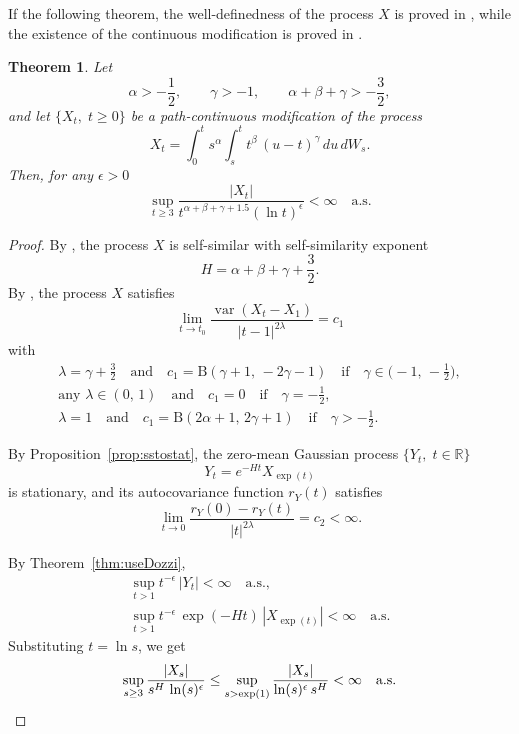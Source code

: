 \documentclass{article}
\DeclareMathOperator{\var}{var}
\theoremstyle{plain}
\newtheorem{thm}{Theorem}
\begin{document}
If the following theorem, the well-definedness
of the process $X$ is proved in
\cite[Theorem~1]{Part1},
while the existence of the continuous modification
is proved in \cite[Theorem~6]{Part1}.
\begin{thm}
Let
\[
\alpha>-\frac12,\qquad
\gamma>-1, \qquad
\alpha+\beta+\gamma > -\frac32 ,
\]
and let $\{X_t,\; t\mathbin{\ge}0\}$ be a path-continuous
modification of the process
\[
X_t = \int_0^t s^\alpha \int_s^t t^\beta\, (u-t)^\gamma \, du \, dW_s.
\]
Then, for any $\epsilon>0$
\[
\sup_{t\ge 3}
\frac{|X_t|}{t^{\alpha+\beta+\gamma+1.5} (\ln t)^\epsilon}
< \infty
\quad \mbox{a.s.}
\]
\end{thm}

\begin{proof}
By \cite[Proposition~1]{Part1}, the process $X$
is self-similar with self-similarity exponent
\[
H = \alpha + \beta + \gamma + \frac32 .
\]
By \cite[Proposition~2]{Part1}, the process $X$
satisfies
\[
\lim_{t\to t_0} \frac{\var(X_t - X_1)}{|t-1|^{2\lambda}} = c_1
\]
with
\begin{gather*}
\lambda=\gamma+\frac32 \quad \mbox{and} \quad
c_1 = \mathrm{B}(\gamma{+}1,\, {-}2\gamma{-}1)
\quad \mbox{if} \quad \gamma\mathbin{\in}\biggl(-1,\, -\frac12 \biggr),
\\
\mbox{any~} \lambda\mathbin{\in}(0,\,1)
\quad \mbox{and} \quad
c_1 = 0
\quad \mbox{if} \quad \gamma\mathbin{=} -\frac12,
\\
\mbox{} \lambda\mathbin{=}1
\quad \mbox{and} \quad
c_1 = \mathrm{B}(2\alpha{+}1,\, 2\gamma{+}1)
\quad \mbox{if} \quad \gamma\mathbin{>} -\frac12.
\end{gather*}

By Proposition~\ref{prop:sstostat},
the zero-mean Gaussian process $\{Y_t,\; t\mathbin{\in}\mathbb{R}\}$
\[
Y_t = e^{-H t} X_{\exp(t)}
\]
is stationary, and its autocovariance function $r_Y(t)$
satisfies
\[
\lim_{t\to 0} \frac{r_Y(0) - r_Y(t)}{|t|^{2\lambda}}
= c_2 < \infty .
\]

By Theorem~\ref{thm:useDozzi},
\begin{gather*}
\sup_{t>1} t^{-\epsilon} \, |Y_t| < \infty
\quad
\mbox{a.s.,}\\
\sup_{t>1} t^{-\epsilon} \, \exp(-Ht)  \, |X_{\exp(t)}| < \infty
\quad \mbox{a.s.}
\end{gather*}
Substituting $t = \ln s$, we get
\begin{equation*}
\sup_{s\ge 3} \frac{|X_s|}{s^H \, \ln (s)^\epsilon}
\le
\sup_{s > \exp(1)} \frac{|X_s|}{\ln (s)^\epsilon \,  s^H}
<
\infty
\quad \mbox{a.s.}   \qedhere
\end{equation*}
\end{proof}
\end{document}
